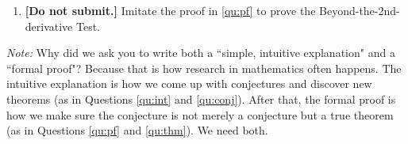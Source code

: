 \documentclass[12pt]{exam}
\begin{document}
\begin{enumerate}
\begin{enumerate}
\begin{itemize}
\begin{itemize}
\begin{center}
			                    (Red line represents $P_n(x)$)
			                \end{center}
		            \end{itemize}
		            Graphically, we have shown that $f$ does not have a local extremum at $a$.
			\end{itemize}
		
		\newpage
		
		\item \label{qu:thm}  {\bf [Do not submit.]}  Imitate the proof in \ref{qu:pf} to prove the Beyond-the-2nd-derivative Test. 	
	\end{enumerate}

\emph{Note:}  Why did we ask you to write both a ``simple, intuitive explanation" and a ``formal proof"?  Because that is how research in mathematics often happens.  The intuitive explanation is how we come up with conjectures and discover new theorems (as in Questions \ref{qu:int} and \ref{qu:conj}).   After that, the formal proof is how we make sure the conjecture is not merely a conjecture but a true theorem (as in Questions \ref{qu:pf} and \ref{qu:thm}).   We need both.

\end{enumerate}
\end{document}

